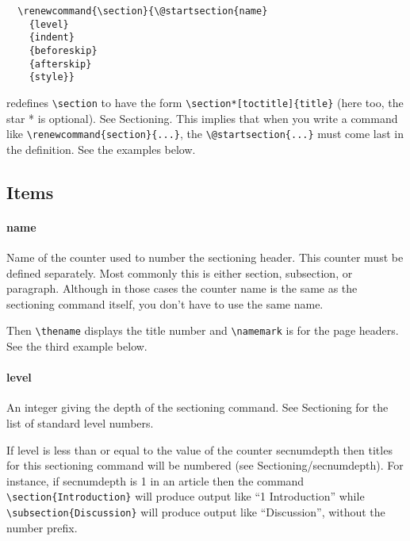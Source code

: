 \begin{verbatim}
  \renewcommand{\section}{\@startsection{name}
    {level}
    {indent}
    {beforeskip}
    {afterskip}
    {style}}
\end{verbatim}

redefines \verb|\section| to have the form \verb|\section*[toctitle]{title}| (here too, the
star * is optional). See Sectioning. This implies that when you write a command
like \verb|\renewcommand{section}{...}|, the \verb|\@startsection{...}| must come last in the
definition. See the examples below.

\subsection{Items}

\paragraph{name}

Name of the counter used to number the sectioning header. This counter must be
defined separately. Most commonly this is either section, subsection, or
paragraph. Although in those cases the counter name is the same as the
sectioning command itself, you don’t have to use the same name.

Then \verb|\thename| displays the title number and \verb|\namemark| is for the
page headers. See the third example below.

\paragraph{level}

An integer giving the depth of the sectioning command. See Sectioning for the
list of standard level numbers.

If level is less than or equal to the value of the counter secnumdepth then
titles for this sectioning command will be numbered (see
Sectioning/secnumdepth). For instance, if secnumdepth is 1 in an article then
the command \verb|\section{Introduction}| will produce output like ``1
Introduction'' while \verb|\subsection{Discussion}| will produce output like
``Discussion'', without the number prefix.

